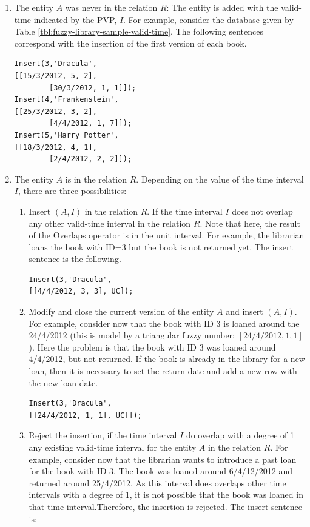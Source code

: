 \begin{enumerate}
\item The entity $A$ was never in the relation $R$: The entity is added with the valid-time indicated by the PVP, $I$.
For example, consider the database given by Table \ref{tbl:fuzzy-library-sample-valid-time}. The following sentences correspond with the insertion of the first version of each book.

\begin{verbatim}
Insert(3,'Dracula',
[[15/3/2012, 5, 2],
        [30/3/2012, 1, 1]]);
Insert(4,'Frankenstein',
[[25/3/2012, 3, 2], 
        [4/4/2012, 1, 7]]);
Insert(5,'Harry Potter',
[[18/3/2012, 4, 1], 
        [2/4/2012, 2, 2]]);
\end{verbatim}





\item The entity $A$ is in the relation $R$. Depending on the value of the time interval $I$, there are three possibilities:
	\begin{enumerate}
	\item Insert $\left(A, I\right)$ in the relation $R$. If the time interval $I$ does not overlap any other valid-time interval in the relation $R$. Note that here, the result of the Overlaps operator is in the unit interval.
For example, the librarian loans the book with ID=3 but the book is not returned yet. The insert sentence is the following.
 \begin{verbatim}
Insert(3,'Dracula',
[[4/4/2012, 3, 3], UC]);
	      \end{verbatim}

	\item Modify and close the current version of the entity $A$ and insert $\left(A, I \right)$. For example, consider now that the book with ID 3 is loaned  around the 24/4/2012 (this is model by a triangular fuzzy number: $\left[24/4/2012, 1, 1 \right]$). Here the problem is that the book with ID 3 was loaned around 4/4/2012, but not returned. If the book is already in the library for a new loan, then it is necessary to set the return date and add a new row with the new loan date. %
	    \begin{verbatim}
Insert(3,'Dracula',
[[24/4/2012, 1, 1], UC]]);
	      \end{verbatim}

	\item Reject the insertion, if the time interval $I$ do overlap with a degree of 1 any existing valid-time interval for the entity $A$ in the relation $R$. For example, consider now that the librarian wants to introduce a past loan for the book with ID 3. The book was loaned around 6/4/12/2012 and returned around 25/4/2012. As this interval does overlaps other time intervals with a degree of 1, it is not possible that the book was loaned in that time interval.Therefore, the insertion is rejected. The insert sentence is:


\end{enumerate}
\end{enumerate}
